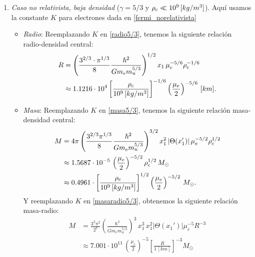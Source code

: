 \begin{enumerate}

 \item \emph{Caso no relativista, baja densidad} ($\gamma=5/3$ y $\rho_{\rm c}\ll10^{9}\,[kg/m^3]$).
Aquí usamos la constante $K$ para electrones dada en \eqref{fermi_norelativista}
\begin{itemize}
 \item \emph{Radio}:
Reemplazando $K$ en \eqref{radio5/3}, tenemos la siguiente relación radio-densidad central:
\begin{align}
R&=\left(\frac{3^{2/3}\cdot\pi^{1/3}}{8}\frac{\hbar^2}{Gm_e m_u^{5/3}}\right)^{1/2}x_1\,\mu_e^{-5/6}\rho_{\rm c}^{-1/6}\\
 &\approx1.1216\cdot10^{4}\left[\frac{\rho_{\rm c}}{10^{9}\,[kg/m^3]}\right]^{-1/6}\left(\frac{\mu_e}{2}\right)^{-5/6}\,[km].
\end{align}
\item \emph{Masa}:
Reemplazando $K$ en \eqref{masa5/3}, tenemos la siguiente relación masa-densidad central:
\begin{align}
M&=4\pi\left(\frac{3^{2/3}\pi^{1/3}}{8}\frac{\hbar^2}{Gm_e m_u^{5/3}}\right)^{3/2}x_1^2\left|\Theta(x_1')\right|\mu_e^{-5/2}\rho_{\rm c}^{1/2}\\
&\approx1.5687\cdot 10^{-5}\,\left(\frac{\mu_e}{2}\right)^{-5/2}\rho_{\rm c}^{1/2}\,M_{\odot}\label{enanablanca5/3-masadensidad}\\
&\approx0.4961\cdot\left[\frac{\rho_{\rm c}}{10^{9}\,[kg/m^3]}\right]^{1/2}\left(\frac{\mu_e}{2}\right)^{-5/2}\,M_{\odot}.
\end{align}
Y reemplazando $K$ en \eqref{masaradio5/3}, obtenemos la siguiente relación masa-radio:
\begin{align}
 M&=\frac{3^2\pi^2}{2^7}\left(\frac{\hbar^2}{Gm_em_u^{5/3}}\right)^3\,x_1^3\,x_1^2\left|\Theta(x_1')\right|\mu_e^{-5} R^{-3}\\
&\approx7.001\cdot10^{11}\,\left(\frac{\mu_e}{2}\right)^{-5} \left[\frac{R}{1\,[km]}\right]^{-3}M_{\odot} \label{enanablanca5/3-masaradio}\\

\end{align}
\end{itemize}
\end{enumerate}
